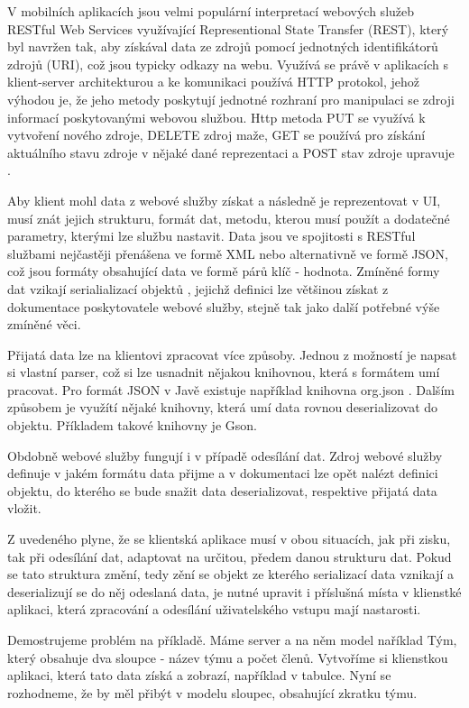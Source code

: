 V mobilních aplikacích jsou velmi populární interpretací webových služeb RESTful Web Services využívající Representional State Transfer (REST), který byl navržen tak, aby získával data ze zdrojů pomocí jednotných identifikátorů zdrojů (URI), což jsou typicky odkazy na webu. Využívá se právě v aplikacích s klient-server architekturou a ke komunikaci používá HTTP protokol, jehož výhodou je, že jeho metody poskytují jednotné rozhraní pro manipulaci se zdroji informací poskytovanými webovou službou. Http metoda PUT se využívá k vytvoření nového zdroje, DELETE zdroj maže, GET se používá pro získání aktuálního stavu zdroje v nějaké dané reprezentaci a POST stav zdroje upravuje \cite{oracle-ws}. 

Aby klient mohl data z webové služby získat a následně je reprezentovat v UI, musí znát jejich strukturu, formát dat, metodu, kterou musí použít a dodatečné parametry, kterými lze službu nastavit. Data jsou ve spojitosti s RESTful službami nejčastěji přenášena ve formě XML nebo alternativně ve formě JSON\cite{ws-formats}, což jsou formáty obsahující data ve formě párů klíč - hodnota. Zmíněné formy dat vzikají serialializací objektů \cite{serialization}, jejichž definici lze většinou získat z dokumentace poskytovatele webové služby, stejně tak jako další potřebné výše zmíněné věci.

Přijatá data lze na klientovi zpracovat více způsoby. Jednou z možností je napsat si vlastní parser, což si lze usnadnit nějakou knihovnou, která s formátem umí pracovat. Pro formát JSON v Javě existuje například knihovna org.json \cite{json}. Dalším způsobem je využítí nějaké knihovny, která umí data rovnou deserializovat do objektu. Příkladem takové knihovny je Gson\cite{gson}. 

Obdobně webové služby fungují i v případě odesílání dat. Zdroj webové služby definuje v jakém formátu data přijme a v dokumentaci lze opět nalézt definici objektu, do kterého se bude snažit data deserializovat, respektive přijatá data vložit. 

Z uvedeného plyne, že se klientská aplikace musí v obou situacích, jak při zisku, tak při odesílání dat, adaptovat na určitou, předem danou strukturu dat. Pokud se tato struktura změní, tedy zění se objekt ze kterého serializací data vznikají a deserializují se \cite{serialization} do něj odeslaná data, je nutné upravit i příslušná místa v klienstké aplikaci, která zpracování a odesílání uživatelského vstupu mají nastarosti.  

Demostrujeme problém na příkladě. Máme server a na něm model naříklad Tým, který obsahuje dva sloupce - název týmu a počet členů. Vytvoříme si klienstkou aplikaci, která tato data získá a zobrazí, například v tabulce. Nyní se rozhodneme, že by měl přibýt v modelu sloupec, obsahující zkratku týmu. 

